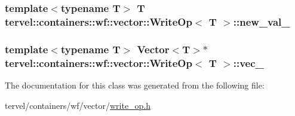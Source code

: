 \subsubsection[{new\+\_\+val\+\_\+}]{\setlength{\rightskip}{0pt plus 5cm}template$<$typename T$>$ T {\bf tervel\+::containers\+::wf\+::vector\+::\+Write\+Op}$<$ T $>$\+::new\+\_\+val\+\_\+\hspace{0.3cm}{\ttfamily [private]}}\label{classtervel_1_1containers_1_1wf_1_1vector_1_1_write_op_af75188ef94bec379f9fafb55248491f2}
\hypertarget{classtervel_1_1containers_1_1wf_1_1vector_1_1_write_op_aad0429090bde2576091caa8ef1713cda}{}
\subsubsection[{vec\+\_\+}]{\setlength{\rightskip}{0pt plus 5cm}template$<$typename T$>$ Vector$<$T$>$$\ast$ {\bf tervel\+::containers\+::wf\+::vector\+::\+Write\+Op}$<$ T $>$\+::vec\+\_\+\hspace{0.3cm}{\ttfamily [private]}}\label{classtervel_1_1containers_1_1wf_1_1vector_1_1_write_op_aad0429090bde2576091caa8ef1713cda}


The documentation for this class was generated from the following file\+:\begin{DoxyCompactItemize}
\item 
tervel/containers/wf/vector/\hyperlink{write__op_8h}{write\+\_\+op.\+h}\end{DoxyCompactItemize}
